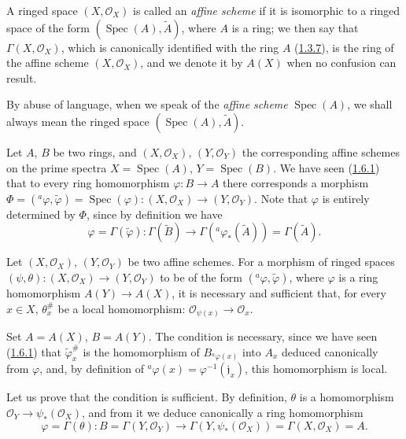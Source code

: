 \begin{definition}[1.7.1]
\label{I.1.7.1}
A ringed space $(X,\mathscr{O}_X)$ is called an \emph{affine scheme} if it
is isomorphic to a ringed space of the form
$(\operatorname{Spec}(A),\widetilde A)$, where $A$ is a ring; we then say
that $\Gamma(X,\mathscr{O}_X)$, which is canonically identified with the ring
$A$ (\hyperref[I.1.3.7]{1.3.7}), is the ring of the affine scheme
$(X,\mathscr{O}_X)$, and we denote it by $A(X)$ when no confusion can
result.
\end{definition}

By abuse of language, when we speak of the \emph{affine scheme}
$\operatorname{Spec}(A)$, we shall always mean the ringed space
$(\operatorname{Spec}(A),\widetilde A)$.

\begin{env}[1.7.2]
\label{I.1.7.2}
Let $A$, $B$ be two rings, and $(X,\mathscr{O}_X)$,
$(Y,\mathscr{O}_Y)$ the corresponding affine schemes on the prime
spectra $X=\operatorname{Spec}(A)$, $Y=\operatorname{Spec}(B)$. We have
seen (\hyperref[I.1.6.1]{1.6.1}) that to every ring homomorphism
$\varphi:B\to A$ there corresponds a morphism
$\Phi=({}^a\varphi,\widetilde\varphi)=\operatorname{Spec}(\varphi):
(X,\mathscr{O}_X)\to(Y,\mathscr{O}_Y)$. Note that $\varphi$ is
entirely determined by $\Phi$, since by definition we have
\[
  \varphi=\Gamma(\widetilde\varphi):
  \Gamma(\widetilde B)\longrightarrow
  \Gamma({}^a\varphi_*(\widetilde A))=\Gamma(\widetilde A).
\]
\end{env}

\begin{theorem}[1.7.3]
\label{I.1.7.3}
Let $(X,\mathscr{O}_X)$, $(Y,\mathscr{O}_Y)$ be two affine schemes. For a
morphism of ringed spaces
$(\psi,\theta):(X,\mathscr{O}_X)\to(Y,\mathscr{O}_Y)$ to be of the form
$({}^a\varphi,\widetilde\varphi)$, where $\varphi$ is a ring homomorphism
$A(Y)\to A(X)$, it is necessary and sufficient that, for every $x\in X$,
$\theta_x^{\#}$ be a local homomorphism:
$\mathscr{O}_{\psi(x)}\to\mathscr{O}_x$.
\end{theorem}

Set $A=A(X)$, $B=A(Y)$. The condition is necessary, since we have seen
(\hyperref[I.1.6.1]{1.6.1}) that $\widetilde\varphi_x^{\#}$ is
the homomorphism of $B_{{}^a\varphi(x)}$ into $A_x$ deduced canonically from
$\varphi$, and, by definition of
${}^a\varphi(x)=\varphi^{-1}(\mathfrak{j}_x)$, this homomorphism is local.

Let us prove that the condition is sufficient. By definition, $\theta$ is a
homomorphism $\mathscr{O}_Y\to\psi_*(\mathscr{O}_X)$, and from it we deduce
canonically a ring homomorphism
\[
  \varphi=\Gamma(\theta):
  B=\Gamma(Y,\mathscr{O}_Y)
  \longrightarrow
  \Gamma(Y,\psi_*(\mathscr{O}_X))=\Gamma(X,\mathscr{O}_X)=A.
\]


